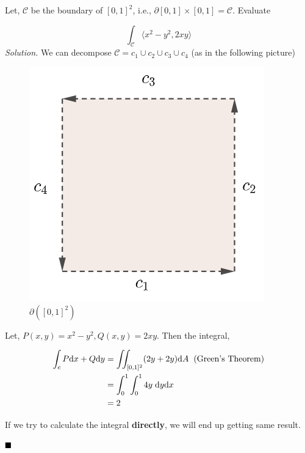 \documentclass[../Analysis-3]{subfiles}
\begin{document}
\begin{Eg}{}{}
    Let, $\mathcal{C}$ be the boundary of $[0,1]^2$, i.e., $\partial [0,1]\times[0,1] = \mathcal{C}$. Evaluate

    \[\int_{\mathcal{C}} \langle x^2-y^2,2xy \rangle\]
    \textit{Solution.} We can decompose $\mathcal{C} = c_1 \cup c_2 \cup c_3 \cup c_4$ (as in the following picture)

    \begin{figure}
        \centering
        \includegraphics[width=.78\linewidth]{../figures/lec-28.2.png}
        \caption{$\partial( [0,1]^2)$}
    \end{figure}

    Let, $P(x,y) = x^2 - y^2, Q(x,y) = 2xy$. Then the integral,

    \begin{align*}
        \int_c P \dd x + Q \dd y & = \iint_{[0,1]^2} (2y + 2y) \dd A \hspace{0.2cm} \text{(Green's Theorem)} \\
                                 & = \int_{0}^1 \int_0^1 4y \hspace{0.1cm} \dd y \dd x                       \\
                                 & = 2
    \end{align*}

    If we try to calculate the integral \textbf{directly}, we will end up getting same result.

    $\hfill \blacksquare$
\end{Eg}
\end{document}
